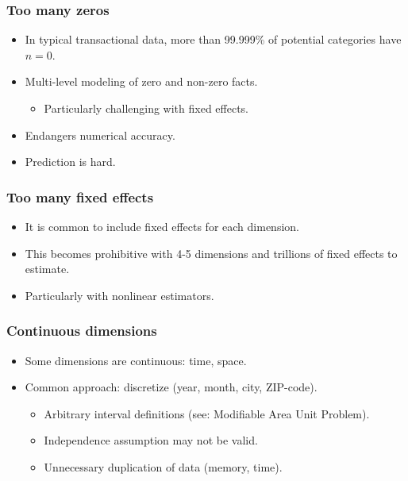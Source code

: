 \documentclass[compress,mathserif]{beamer}
\begin{document}
\begin{frame}\frametitle{Too many zeros}\hypertarget{Too many zeros}{}
\begin{itemize}
\item In typical transactional data, more than 99.999\% of potential categories have $n=0$.

\item Multi-level modeling of zero and non-zero facts.
\begin{itemize}
\item Particularly challenging with fixed effects.
\end{itemize}

\item Endangers numerical accuracy.

\item Prediction is hard.


\end{itemize}
\end{frame}



\begin{frame}\frametitle{Too many fixed effects}\hypertarget{Too many fixed effects}{}
\begin{itemize}
\item It is common to include fixed effects for each dimension.

\item This becomes prohibitive with 4-5 dimensions and trillions of fixed effects to estimate.

\item Particularly with nonlinear estimators.


\end{itemize}
\end{frame}



\begin{frame}\frametitle{Continuous dimensions}\hypertarget{Continuous dimensions}{}
\begin{itemize}
\item Some dimensions are continuous: time, space.

\item Common approach: discretize (year, month, city, ZIP-code).
\begin{itemize}
\item Arbitrary interval definitions (see: Modifiable Area Unit Problem).

\item Independence assumption may not be valid.

\item Unnecessary duplication of data (memory, time).






\end{itemize}

\end{itemize}
\end{frame}
\end{document}
